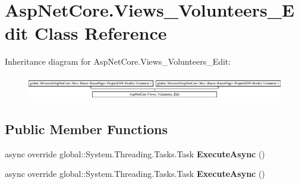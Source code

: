 \hypertarget{class_asp_net_core_1_1_views___volunteers___edit}{}\section{Asp\+Net\+Core.\+Views\+\_\+\+Volunteers\+\_\+\+Edit Class Reference}
\label{class_asp_net_core_1_1_views___volunteers___edit}
Inheritance diagram for Asp\+Net\+Core.\+Views\+\_\+\+Volunteers\+\_\+\+Edit\+:\begin{figure}[H]
\begin{center}
\leavevmode
\includegraphics[height=1.087379cm]{class_asp_net_core_1_1_views___volunteers___edit}
\end{center}
\end{figure}
\subsection*{Public Member Functions}
\begin{DoxyCompactItemize}
\item 
\mbox{\label{class_asp_net_core_1_1_views___volunteers___edit_a60f1787fb680ac6ef2fd3ffac67c80e6}} 
async override global\+::\+System.\+Threading.\+Tasks.\+Task {\bfseries Execute\+Async} ()
\item 
\mbox{\label{class_asp_net_core_1_1_views___volunteers___edit_a60f1787fb680ac6ef2fd3ffac67c80e6}} 
async override global\+::\+System.\+Threading.\+Tasks.\+Task {\bfseries Execute\+Async} ()
\end{DoxyCompactItemize}
